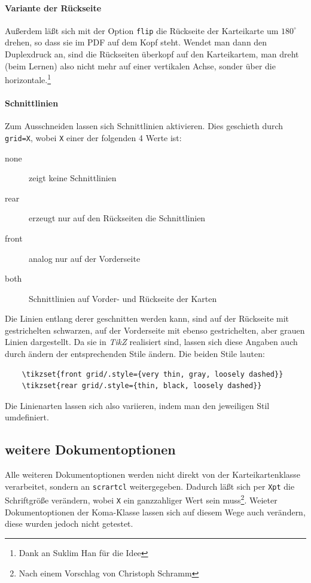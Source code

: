 \documentclass[a4paper,DIV=calc]{scrartcl}
\begin{document}
\paragraph{Variante der Rückseite} 
Außerdem läßt sich mit der Option \lstinline!flip! die Rückseite der Karteikarte um $180^{\circ}$ drehen, so dass sie im PDF auf dem Kopf steht. Wendet man dann den Duplexdruck an, sind die Rückseiten überkopf auf den Karteikartem, man dreht (beim Lernen) also nicht mehr auf einer vertikalen Achse, sonder über die horizontale.\footnote{Dank an Suklim Han für die Idee}

\paragraph{Schnittlinien}
Zum Ausschneiden lassen sich Schnittlinien aktivieren. Dies geschieth durch  \lstinline!grid=X!, wobei \lstinline!X! einer der folgenden 4 Werte ist:
\begin{description}
	\item[none] zeigt keine Schnittlinien
	\item[rear] erzeugt nur auf den Rückseiten die Schnittlinien
	\item[front] analog nur auf der Vorderseite
	\item[both] Schnittlinien auf Vorder- und Rückseite der Karten	
\end{description}
Die Linien entlang derer geschnitten werden kann, sind auf der Rückseite mit gestrichelten schwarzen, auf der Vorderseite mit ebenso gestrichelten, aber grauen Linien dargestellt. Da sie in \emph{TikZ} realisiert sind, lassen sich diese Angaben auch durch ändern der entsprechenden Stile ändern. Die beiden Stile lauten:
\begin{lstlisting}
	\tikzset{front grid/.style={very thin, gray, loosely dashed}}
	\tikzset{rear grid/.style={thin, black, loosely dashed}}
\end{lstlisting}
Die Linienarten lassen sich also variieren, indem man den jeweiligen Stil umdefiniert.
\subsection{weitere Dokumentoptionen}
Alle weiteren Dokumentoptionen werden nicht direkt von der Karteikartenklasse verarbeitet, sondern an \lstinline!scrartcl! weitergegeben. Dadurch läßt sich per \lstinline!Xpt! die Schriftgröße verändern, wobei \lstinline!X! ein ganzzahliger Wert sein muss\footnote{Nach einem Vorschlag von Christoph Schramm}. Weieter Dokumentoptionen der Koma-Klasse lassen sich auf diesem Wege auch verändern, diese wurden jedoch nicht getestet.
\end{document}
